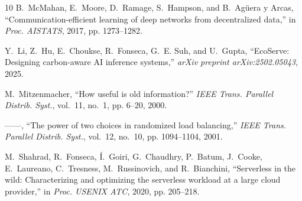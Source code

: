 \documentclass[journal]{IEEEtran}
\begin{document}
\begin{thebibliography}{10}
B.~McMahan, E.~Moore, D.~Ramage, S.~Hampson, and B.~{Ag{\"u}era y Arcas},
  ``Communication-efficient learning of deep networks from decentralized
  data,'' in \emph{Proc. AISTATS}, 2017, pp. 1273--1282.

Y.~Li, Z.~Hu, E.~Choukse, R.~Fonseca, G.~E. Suh, and U.~Gupta, ``{EcoServe}:
  Designing carbon-aware {AI} inference systems,'' \emph{arXiv preprint
  arXiv:2502.05043}, 2025.

M.~Mitzenmacher, ``How useful is old information?'' \emph{IEEE Trans. Parallel
  Distrib. Syst.}, vol.~11, no.~1, pp. 6--20, 2000.

------, ``The power of two choices in randomized load balancing,'' \emph{IEEE
  Trans. Parallel Distrib. Syst.}, vol.~12, no.~10, pp. 1094--1104, 2001.

M.~Shahrad, R.~Fonseca, {\'I}.~Goiri, G.~Chaudhry, P.~Batum, J.~Cooke,
  E.~Laureano, C.~Tresness, M.~Russinovich, and R.~Bianchini, ``Serverless in
  the wild: Characterizing and optimizing the serverless workload at a large
  cloud provider,'' in \emph{Proc. USENIX ATC}, 2020, pp. 205--218.

\end{thebibliography}
\end{document}
